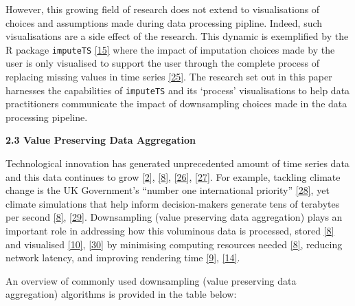 \documentclass{article}
\begin{document}
However, this growing field of research does not extend to
visualisations of choices and assumptions made during data processing
pipline. Indeed, such visualisations are a side effect of the research.
This dynamic is exemplified by the R package \texttt{imputeTS}
\protect\hyperlink{ref-imputeTS_R}{{[}15{]}} where the impact of
imputation choices made by the user is only visualised to support the
user through the complete process of replacing missing values in time
series \protect\hyperlink{ref-imputeTS}{{[}25{]}}. The research set out
in this paper harnesses the capabilities of \texttt{imputeTS} and its
`process' visualisations to help data practitioners communicate the
impact of downsampling choices made in the data processing pipeline.

\textbf{2.3 Value Preserving Data Aggregation}

Technological innovation has generated unprecedented amount of time
series data and this data continues to grow
\protect\hyperlink{ref-data2020}{{[}2{]}},
\protect\hyperlink{ref-TVStore}{{[}8{]}},
\protect\hyperlink{ref-storage}{{[}26{]}},
\protect\hyperlink{ref-CatchUp}{{[}27{]}}. For example, tackling climate
change is the UK Government's ``number one international priority''
\protect\hyperlink{ref-IR}{{[}28{]}}, yet climate simulations that help
inform decision-makers generate tens of terabytes per second
\protect\hyperlink{ref-TVStore}{{[}8{]}},
\protect\hyperlink{ref-climate}{{[}29{]}}. Downsampling (value
preserving data aggregation) plays an important role in addressing how
this voluminous data is processed, stored
\protect\hyperlink{ref-TVStore}{{[}8{]}} and visualised
\protect\hyperlink{ref-Sveinn}{{[}10{]}},
\protect\hyperlink{ref-dashql}{{[}30{]}} by minimising computing
resources needed \protect\hyperlink{ref-TVStore}{{[}8{]}}, reducing
network latency, and improving rendering time
\protect\hyperlink{ref-datapoint}{{[}9{]}},
\protect\hyperlink{ref-MinMaxLTTB}{{[}14{]}}.

An overview of commonly used downsampling (value preserving data
aggregation) algorithms is provided in the table below:
\end{document}
